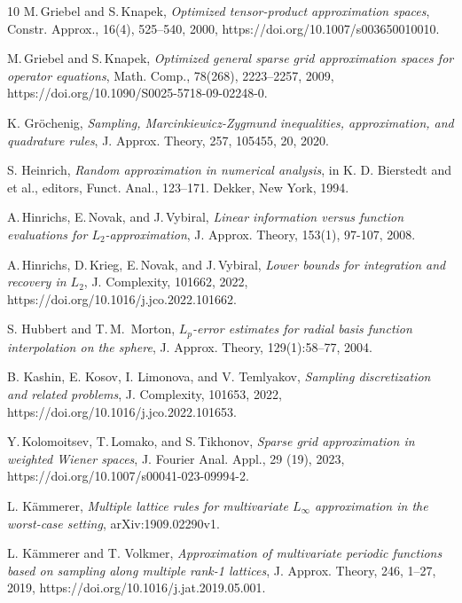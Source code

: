 \documentclass[a4paper,12pt]{amsart}
\theoremstyle{definition}
\theoremstyle{remark}
\begin{document}
{\begin{thebibliography}{10}
M.\,Griebel and S.\,Knapek, 
{\it Optimized tensor-product approximation spaces}, 
Constr. Approx., 16(4), 525--540, 2000, https://doi.org/10.1007/s003650010010.

M.\,Griebel and S.\,Knapek, 
{\it Optimized general sparse grid approximation spaces for operator equations},
Math. Comp.,
78(268), 2223--2257, 2009, https://doi.org/10.1090/S0025-5718-09-02248-0.

 K. Gröchenig, {\it Sampling, Marcinkiewicz-Zygmund inequalities, approximation, and quadrature rules}, J. Approx. Theory, 257, 105455, 20, 2020.

 S. Heinrich, {\it Random approximation in numerical analysis}, in K. D. Bierstedt and et al.,
editors, Funct. Anal.,  123--171. Dekker, New York, 1994.
	
 A.\,Hinrichs, E.\,Novak, and J.\,Vybiral, {\it  Linear information versus function evaluations for $L_2$-approximation}, J. Approx. Theory, 153(1), 
97-107, 2008.



 A.\,Hinrichs, D.\,Krieg, E.\,Novak, and J.\,Vybiral, 
{\it Lower bounds for integration and recovery in $L_2$}, J. Complexity, 101662, 2022, https://doi.org/10.1016/j.jco.2022.101662.

 S. Hubbert and T.\,M.~Morton,
{\it $L_p$-error estimates for radial basis function interpolation on the sphere},
J. Approx. Theory, 129(1):58--77, 2004.




 B. Kashin, E. Kosov, I. Limonova, and V. Temlyakov,
{\it Sampling discretization and related problems},
J. Complexity, 101653, 2022,
https://doi.org/10.1016/j.jco.2022.101653.

Y.\,Kolomoitsev, T.\,Lomako, and S.\,Tikhonov, 
{\it Sparse grid approximation in weighted {W}iener spaces},
J. Fourier Anal. Appl.,  29 (19), 2023, https://doi.org/10.1007/s00041-023-09994-2.





 L. K\"ammerer,
{\it Multiple lattice rules for multivariate {$L_{\infty}$} approximation in the worst-case setting},
   {arXiv:1909.02290v1}.
 
  L. K\"ammerer and T.  Volkmer, 
{\it Approximation of multivariate periodic functions based on sampling along multiple rank-1 lattices},
 {J. Approx. Theory},
  {246}, {1--27},
  {2019},
https://doi.org/10.1016/j.jat.2019.05.001.



\end{thebibliography}}
\end{document}
